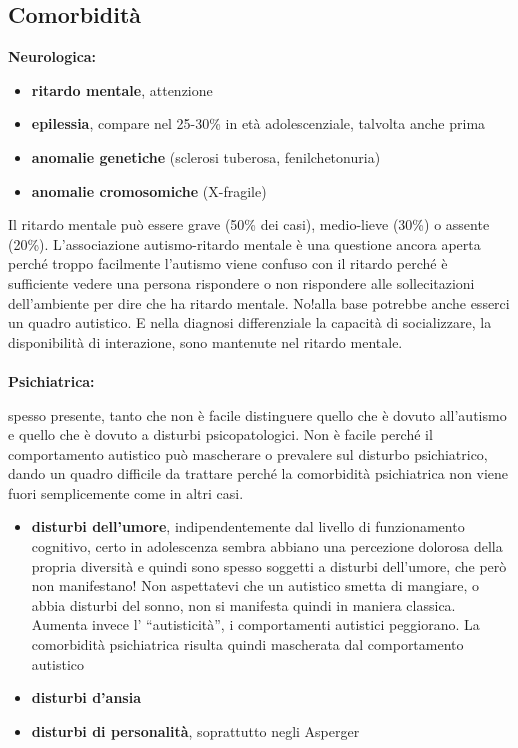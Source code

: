 \subsection{Comorbidità}

\textbf{Neurologica:}

\begin{itemize}
\item
  \textbf{ritardo mentale}, attenzione
\item
  \textbf{epilessia}, compare nel 25-30\% in età adolescenziale,
  talvolta anche prima
\item
  \textbf{anomalie genetiche} (sclerosi tuberosa, fenilchetonuria)
\item
  \textbf{anomalie cromosomiche} (X-fragile)
\end{itemize}

Il ritardo mentale può essere grave (50\% dei casi), medio-lieve (30\%)
o assente (20\%). L'associazione autismo-ritardo mentale è una questione
ancora aperta perché troppo facilmente l'autismo viene confuso con il
ritardo perché è sufficiente vedere una persona rispondere o non
rispondere alle sollecitazioni dell'ambiente per dire che ha ritardo
mentale. No!alla base potrebbe anche esserci un quadro autistico. E
nella diagnosi differenziale la capacità di socializzare, la
disponibilità di interazione, sono mantenute nel ritardo mentale.
\\\\
\textbf{Psichiatrica:}

spesso presente, tanto che non è facile distinguere quello che è dovuto
all'autismo e quello che è dovuto a disturbi psicopatologici. Non è
facile perché il comportamento autistico può mascherare o prevalere sul
disturbo psichiatrico, dando un quadro difficile da trattare perché la
comorbidità psichiatrica non viene fuori semplicemente come in altri
casi.

\begin{itemize}
\item
  \textbf{disturbi dell'umore}, indipendentemente dal livello di
  funzionamento cognitivo, certo in adolescenza sembra abbiano una
  percezione dolorosa della propria diversità e quindi sono spesso
  soggetti a disturbi dell'umore, che però non manifestano! Non
  aspettatevi che un autistico smetta di mangiare, o abbia disturbi del
  sonno, non si manifesta quindi in maniera classica. Aumenta invece l'
  ``autisticità'', i comportamenti autistici peggiorano. La comorbidità
  psichiatrica risulta quindi mascherata dal comportamento autistico
\item
  \textbf{disturbi d'ansia}
\item
  \textbf{disturbi di personalità}, soprattutto negli Asperger
\end{itemize}

